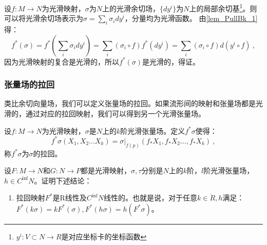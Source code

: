 设$f:M\rightarrow N$为光滑映射，$\sigma$为$N$上的光滑余切场，$\{dy^i\}$为$N$上的局部余切基\footnote{$y^i:V\subset N\rightarrow R$是对应坐标卡的坐标函数}。则可以将光滑余切场表示为$\sigma=\sum_i\sigma_idy^i $，分量均为光滑函数。
由\autoref{lem_PullBk_1} 得：
\begin{equation}
f^*(\sigma)=f^*(\sum_i\sigma_idy^i)=\sum_i(\sigma_i\circ f)f^*(dy^i)=\sum_i(\sigma_i\circ f)d(y^i\circ f)~,
\end{equation}
因为光滑映射的复合是光滑的，所以$f^*(\sigma)$是光滑的，得证。
\subsubsection{张量场的拉回}
类比余切向量场，我们可以定义张量场的拉回。如果流形间的映射和张量场都是光滑的，通过对应的拉回映射，我们可以得到另一个光滑张量场。
\begin{definition}{}
设$f:M\rightarrow N$为光滑映射，$\sigma$是$N$上的$k$阶光滑张量场。定义$f^*\sigma$使得：
\begin{equation}
f^*\sigma(X_1,X_2...X_k)=\sigma|_{f(p)}(f_*X_1,f_*X_2...,f_*X_k)~,
\end{equation}
称$f^*\sigma$为$\sigma$的拉回。
\end{definition}
\begin{exercise}{}
设$F:M\rightarrow N$和$G:N\rightarrow P$都是光滑映射，$\sigma,\tau$分别是$N$上的$k$阶，$l$阶光滑张量场，$h\in C^{\inf}N$。证明下述结论：
\begin{enumerate}
\item 拉回映射$F^*$是$\mathrm R$线性及$C^{\inf }N$线性的。也就是说，对于任意$k\in \mathring R,h$满足：$F^*(k\sigma)=kF^*(\sigma),F^*(h\sigma)=h(F^*\sigma)$。
\end{enumerate}
\end{exercise}
